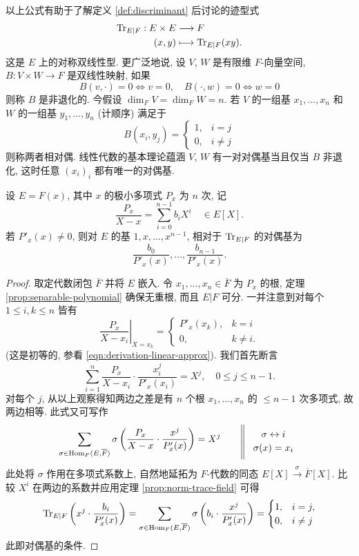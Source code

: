 以上公式有助于了解定义 \ref{def:discriminant} 后讨论的迹型式
\begin{align*}
	\operatorname{Tr}_{E|F}: E \times E & \longrightarrow F \\
	(x,y) & \longmapsto \operatorname{Tr}_{E|F}(xy).
\end{align*}
这是 $E$ 上的对称双线性型. 更广泛地说, 设 $V$, $W$ 是有限维 $F$-向量空间, $B: V \times W \to F$ 是双线性映射, 如果
\[ B(v,\cdot) = 0 \iff v=0, \quad B(\cdot,w)=0 \iff w=0 \]
则称 $B$ 是非退化的. 今假设 $\dim_F V = \dim_F W = n$. 若 $V$ 的一组基 $x_1, \ldots, x_n$ 和 $W$ 的一组基 $y_1, \ldots, y_n$ (计顺序) 满足于
\[ B(x_i, y_j) = \begin{cases} 1, & i=j \\ 0, & i \neq j \end{cases} \]
则称两者相对偶. 线性代数的基本理论蕴涵 $V$, $W$ 有一对对偶基当且仅当 $B$ 非退化, 这时任意 $(x_i)_i$ 都有唯一的对偶基.

\begin{theorem}
	设 $E=F(x)$, 其中 $x$ 的极小多项式 $P_x$ 为 $n$ 次, 记
	\[ \frac{P_x}{X-x} = \sum_{i=0}^{n-1} b_i X^i \quad \in E[X]. \]
	若 $P'_x(x) \neq 0$, 则对 $E$ 的基 $1, x, \ldots, x^{n-1}$, 相对于 $\operatorname{Tr}_{E|F}$ 的对偶基为
	\[ \frac{b_0}{P'_x(x)}, \ldots, \frac{b_{n-1}}{P'_x(x)}. \]
\end{theorem}
\begin{proof}
	取定代数闭包 $\overline{F}$ 并将 $E$ 嵌入. 令 $x_1, \ldots, x_n \in \overline{F}$ 为 $P_x$ 的根, 定理 \ref{prop:separable-polynomial} 确保无重根, 而且 $E|F$ 可分. 一并注意到对每个 $1 \leq i,k \leq n$ 皆有
	\[ \left. \frac{P_x}{X - x_i} \right|_{X=x_k} = \begin{cases}
		P'_x(x_k), & k =i \\
		0, & k \neq i.
	\end{cases}\]
	(这是初等的, 参看 \eqref{eqn:derivation-linear-approx}). 我们首先断言
	\[ \sum_{i=1}^n \frac{P_x}{X-x_i} \cdot \frac{x_i^j}{P'_x(x_i)} = X^j, \quad 0 \leq j \leq n-1. \]
	对每个 $j$, 从以上观察得知两边之差是有 $n$ 个根 $x_1, \ldots, x_n$ 的 $\leq n-1$ 次多项式, 故两边相等. 此式又可写作
	\[ \sum_{\sigma \in \Hom_F(E,\overline{F})} \sigma \left( \frac{P_x}{X-x} \cdot \frac{x^j}{P'_x(x)} \right) = X^j \qquad
	\begin{tikzpicture}[baseline]
			\matrix[matrix of math nodes, left delimiter={\|}]
				{\sigma \leftrightarrow i \\ \sigma(x)=x_i \\ };
	\end{tikzpicture} \]
	此处将 $\sigma$ 作用在多项式系数上, 自然地延拓为 $F$-代数的同态 $E[X] \xrightarrow{\sigma} \overline{F}[X]$. 比较 $X^i$ 在两边的系数并应用定理 \ref{prop:norm-trace-field} 可得
	\[ \operatorname{Tr}_{E|F}\left(  x^j \cdot \frac{b_i}{P'_x(x)}\right)=\sum_{\sigma \in \operatorname{Hom}_F(E,\overline{F})} \sigma \left( b_i \cdot \frac{x^j}{P'_x(x)} \right)  = \begin{cases} 1, & i=j, \\ 0, & i \neq j \end{cases} \]
	此即对偶基的条件.
\end{proof}


